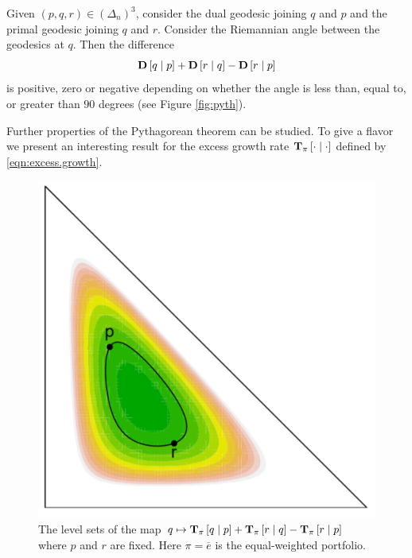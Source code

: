\documentclass[graybox]{svmult}
\begin{document}
\begin{theorem}  \label{thm:pyth}
Given $(p, q, r) \in \left(\Delta_n\right)^3$, consider the dual geodesic joining $q$ and $p$ and the primal geodesic joining $q$ and $r$. Consider the Riemannian angle between the geodesics at $q$. Then the difference
\begin{equation} \label{eqn:pyth}
{\bf D}\left[q \mid p\right] + {\bf D}\left[r \mid q\right] - {\bf D}\left[r \mid p\right]
\end{equation}
is positive, zero or negative depending on whether the angle is less than, equal to, or greater than $90$ degrees (see Figure \ref{fig:pyth}). 
\end{theorem}

Further properties of the Pythagorean theorem can be studied. To give a flavor we present an interesting result for the excess growth rate ${\bf T}_{\pi}\left[ \cdot \mid \cdot\right]$ defined by \eqref{eqn:excess.growth}.

\begin{figure}[t!]
\centering
\includegraphics[scale=0.25]{pyth1.pdf}
\caption{The level sets of the map $q \mapsto {\bf T}_{\pi}\left[q \mid p\right] + {\bf T}_{\pi}\left[r \mid q\right] - {\bf T}_{\pi}\left[r \mid p\right]$ where $p$ and $r$ are fixed. Here $\pi = \overline{e}$ is the equal-weighted portfolio.} \label{fig:region}
\end{figure}
\end{document}
